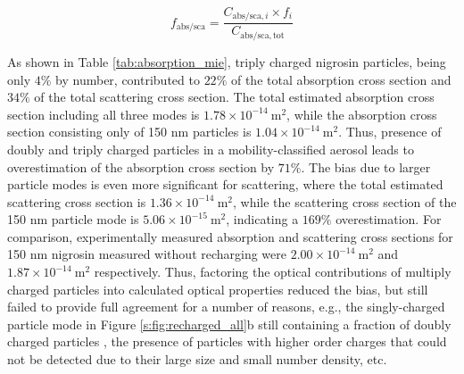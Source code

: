 \documentclass[12pt,authoryear]{elsarticle}
\begin{document}
\begin{equation}
    f_{\mathrm{abs/sca}}=\frac{C_{\mathrm{abs/sca},i}\times f_i}{C_\mathrm{abs/sca,tot}}
    \label{eq:contribution}
\end{equation}

As shown in Table \ref{tab:absorption_mie}, triply charged nigrosin particles, being only $4\%$ by number, contributed to $22\%$ of the total absorption cross section and $34\%$ of the total scattering cross section. The total estimated absorption cross section including all three modes is $1.78\times 10^{-14}\ \mathrm{m}^2$, while the absorption cross section consisting only of 150 nm particles is $1.04\times 10^{-14}\ \mathrm{m}^2$. Thus, presence of doubly and triply charged particles in a mobility-classified aerosol leads to overestimation of the absorption cross section by $71\%$. The bias due to larger particle modes is even more significant for scattering, where the total estimated scattering cross section is $1.36\times 10^{-14}\ \mathrm{m}^2$, while the scattering cross section of the 150 nm particle mode is $5.06\times 10^{-15}\ \mathrm{m}^2$, indicating a $169\%$ overestimation. For comparison, experimentally measured absorption and scattering cross sections for 150 nm nigrosin measured without recharging were $2.00\times 10^{-14}\ \mathrm{m}^2$ and $1.87\times 10^{-14}\ \mathrm{m}^2$ respectively. Thus, factoring the optical contributions of multiply charged particles into calculated optical properties reduced the bias, but still failed to provide full agreement for a number of reasons, e.g., the singly-charged particle mode in Figure \ref{s:fig:recharged_all}b still containing a fraction of doubly charged particles \citep{RN7}, the presence of particles with higher order charges that could not be detected due to their large size and small number density, etc.
\end{document}

